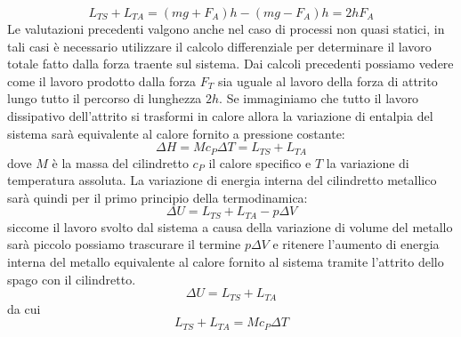 \documentclass[a4paper,10pt,oneside]{article}
\begin{document}
\begin{equation}
 L_{TS}+L_{TA}=(mg+F_A)h-(mg-F_A)h=2hF_A
\end{equation}
Le valutazioni precedenti valgono anche nel caso di processi non quasi statici, in tali casi è necessario utilizzare il calcolo differenziale per determinare il lavoro totale fatto dalla forza traente sul sistema. Dai calcoli precedenti possiamo vedere come il lavoro prodotto dalla forza $F_T$ sia uguale al lavoro della forza di attrito lungo tutto il percorso di lunghezza $2h$.
Se immaginiamo che tutto il lavoro dissipativo dell'attrito si trasformi in calore allora la variazione di entalpia del sistema sarà equivalente al calore fornito a pressione costante:
\begin{equation}\label{eq:en_int}
 \Delta H=Mc_P\Delta T= L_{TS}+L_{TA}
\end{equation}
dove $M$ è la massa del cilindretto $c_P$ il calore specifico e $T$ la variazione di temperatura assoluta. La variazione di energia interna del cilindretto metallico sarà quindi per il primo principio della termodinamica:
\begin{equation}
 \Delta U=L_{TS}+L_{TA} -p\Delta V
\end{equation}
siccome il lavoro svolto dal sistema a causa della variazione di volume del metallo sarà piccolo possiamo trascurare il termine $p\Delta V$ e ritenere l'aumento di energia interna del metallo equivalente al calore fornito al sistema tramite l'attrito dello spago con il cilindretto. 
\begin{equation}
 \Delta U= L_{TS}+L_{TA}
\end{equation}
da cui
\begin{equation}
 L_{TS}+L_{TA}=Mc_P\Delta T
\end{equation}
\end{document}
